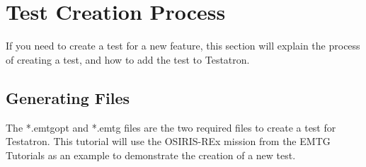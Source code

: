 \documentclass[11pt]{article}
\begin{document}
\section{Test Creation Process}
\label{sec:test_creation_process}

If you need to create a test for a new feature, this section will explain the process of creating a test, and how to add the test to Testatron.

\subsection{Generating Files}
\label{sec:generating_files}

The *.emtgopt and *.emtg files are the two required files to create a test for Testatron. This tutorial will use the OSIRIS-REx mission from the \ac{EMTG} Tutorials as an example to demonstrate the creation of a new test.
\end{document}
